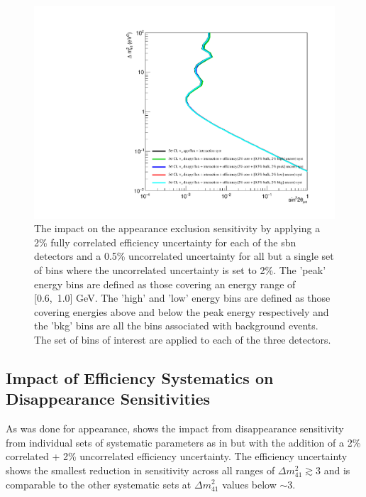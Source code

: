 \begin{figure}[h!]
    \centering
    \includegraphics[width = \largefigwidth]{figures-chap6/exclusion_contours/efficiency_systematics/nue_app_2pct_cor_05pct_bulk_2pct_X_uncor.pdf}
    \caption[\nue disapp with poorly constrained efficiency systematic for a set of bins.]{The impact on the \nue appearance exclusion sensitivity by applying a 2\% fully correlated efficiency uncertainty for each of the \gls{sbn} detectors and a 0.5\% uncorrelated uncertainty for all but a single set of bins where the uncorrelated uncertainty is set to 2\%. The 'peak' energy bins are defined as those covering an energy range of [0.6,~1.0] GeV. The 'high' and 'low' energy bins are defined as those covering energies above and below the peak energy respectively and the 'bkg' bins are all the bins associated with background events. The set of bins of interest are applied to each of the three detectors.}
    \label{fig:nue_app_bulk_uncertainty}
\end{figure}



\clearpage

\subsection{\texorpdfstring{Impact of Efficiency Systematics on \nue Disappearance Sensitivities}{Impact of Efficiency Systematics on nue Disappearance Sensitivities}}

As was done for \nue appearance,  shows the impact from \nue disappearance sensitivity from individual sets of systematic parameters as in  but with the addition of a 2\% correlated + 2\% uncorrelated efficiency uncertainty. The efficiency uncertainty shows the smallest reduction in sensitivity across all ranges of $\Delta m_{41}^2 \gtrsim 3$ and is comparable to the other systematic sets at $\Delta m_{41}^2$ values below $\sim 3$.

